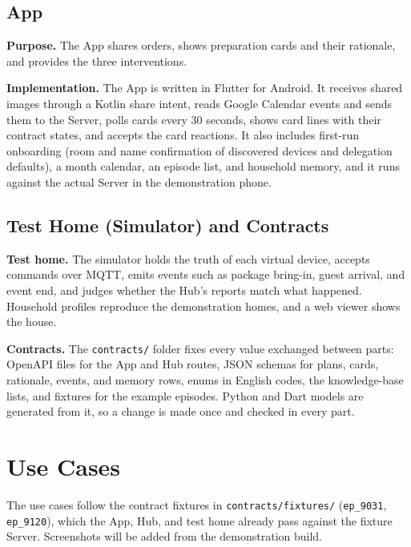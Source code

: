 \documentclass[conference]{IEEEtran}
\begin{document}
\subsection{App}
\textbf{Purpose.} The App shares orders, shows preparation cards and their rationale, and provides the three interventions.

\textbf{Implementation.} The App is written in Flutter for Android. It receives shared images through a Kotlin share intent, reads Google Calendar events and sends them to the Server, polls cards every 30 seconds, shows card lines with their contract states, and accepts the card reactions. It also includes first-run onboarding (room and name confirmation of discovered devices and delegation defaults), a month calendar, an episode list, and household memory, and it runs against the actual Server in the demonstration phone.

\subsection{Test Home (Simulator) and Contracts}
\textbf{Test home.} The simulator holds the truth of each virtual device, accepts commands over MQTT, emits events such as package bring-in, guest arrival, and event end, and judges whether the Hub's reports match what happened. Household profiles reproduce the demonstration homes, and a web viewer shows the house.

\textbf{Contracts.} The \texttt{contracts/} folder fixes every value exchanged between parts: OpenAPI files for the App and Hub routes, JSON schemas for plans, cards, rationale, events, and memory rows, enums in English codes, the knowledge-base lists, and fixtures for the example episodes. Python and Dart models are generated from it, so a change is made once and checked in every part.

\section{Use Cases}
The use cases follow the contract fixtures in \texttt{contracts/fixtures/} (\texttt{ep\_9031}, \texttt{ep\_9120}), which the App, Hub, and test home already pass against the fixture Server. Screenshots will be added from the demonstration build.
\end{document}
